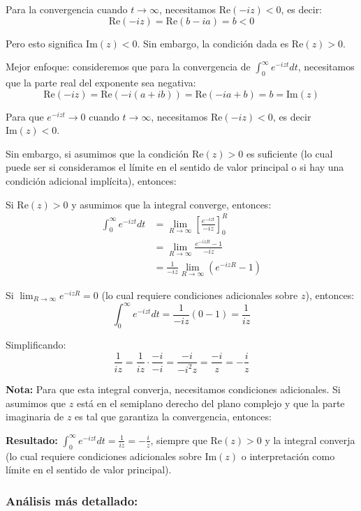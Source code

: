 \documentclass{article}
\begin{document}
Para la convergencia cuando $t \to \infty$, necesitamos $\text{Re}(-iz) < 0$, es decir:
$$\text{Re}(-iz) = \text{Re}(b - ia) = b < 0$$

Pero esto significa $\text{Im}(z) < 0$. Sin embargo, la condición dada es $\text{Re}(z) > 0$.

Mejor enfoque: consideremos que para la convergencia de $\int_0^{\infty} e^{-izt} dt$, necesitamos que la parte real del exponente sea negativa:
$$\text{Re}(-iz) = \text{Re}(-i(a + ib)) = \text{Re}(-ia + b) = b = \text{Im}(z)$$

Para que $e^{-izt} \to 0$ cuando $t \to \infty$, necesitamos $\text{Re}(-iz) < 0$, es decir $\text{Im}(z) < 0$.

Sin embargo, si asumimos que la condición $\text{Re}(z) > 0$ es suficiente (lo cual puede ser si consideramos el límite en el sentido de valor principal o si hay una condición adicional implícita), entonces:

Si $\text{Re}(z) > 0$ y asumimos que la integral converge, entonces:
\begin{align*}
\int_0^{\infty} e^{-izt} dt &= \lim_{R \to \infty} \left[\frac{e^{-izt}}{-iz}\right]_0^R \\
                            &= \lim_{R \to \infty} \frac{e^{-izR} - 1}{-iz} \\
                            &= \frac{1}{-iz} \lim_{R \to \infty} (e^{-izR} - 1)
\end{align*}

Si $\lim_{R \to \infty} e^{-izR} = 0$ (lo cual requiere condiciones adicionales sobre $z$), entonces:
$$\int_0^{\infty} e^{-izt} dt = \frac{1}{-iz} (0 - 1) = \frac{1}{iz}$$

Simplificando:
$$\frac{1}{iz} = \frac{1}{iz} \cdot \frac{-i}{-i} = \frac{-i}{-i^2z} = \frac{-i}{z} = -\frac{i}{z}$$

\textbf{Nota:} Para que esta integral converja, necesitamos condiciones adicionales. Si asumimos que $z$ está en el semiplano derecho del plano complejo y que la parte imaginaria de $z$ es tal que garantiza la convergencia, entonces:

\textbf{Resultado:} $\int_0^{\infty} e^{-izt} dt = \frac{1}{iz} = -\frac{i}{z}$, siempre que $\text{Re}(z) > 0$ y la integral converja (lo cual requiere condiciones adicionales sobre $\text{Im}(z)$ o interpretación como límite en el sentido de valor principal).

\subsubsection*{Análisis más detallado:}
\end{document}
